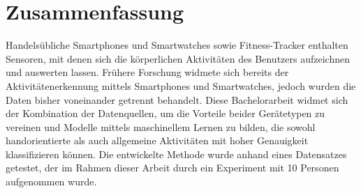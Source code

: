 \chapter*{Zusammenfassung}
Handelsübliche Smartphones und Smartwatches sowie Fitness-Tracker enthalten Sensoren, mit denen sich die körperlichen Aktivitäten des Benutzers aufzeichnen und auswerten lassen. Frühere Forschung widmete sich bereits der Aktivitätenerkennung mittels Smartphones und Smartwatches, jedoch wurden die Daten bisher voneinander getrennt behandelt. Diese Bachelorarbeit widmet sich der Kombination der Datenquellen, um die Vorteile beider Gerätetypen zu vereinen und Modelle mittels maschinellem Lernen zu bilden, die sowohl handorientierte als auch allgemeine Aktivitäten mit hoher Genauigkeit klassifizieren können. Die entwickelte Methode wurde anhand eines Datensatzes getestet, der im Rahmen dieser Arbeit durch ein Experiment mit 10 Personen aufgenommen wurde.

